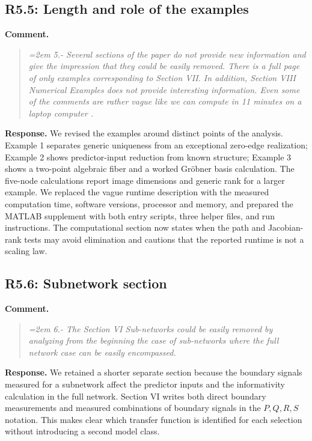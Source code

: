 \documentclass[11pt]{article}
\begin{document}
\subsection*{R5.5: Length and role of the examples}
\textbf{Comment.}
\begin{quote}\itshape\emergencystretch=2em
5.- Several sections of the paper do not provide new information and give the impression that they could be easily removed. There is a full page of only examples corresponding to Section VII. In addition, Section VIII Numerical Examples does not provide interesting information. Even some of the comments are rather vague like we can compute in 11 minutes on a laptop computer .
\end{quote}

\textbf{Response.} We revised the examples around distinct points of the
analysis. Example 1 separates generic uniqueness from an exceptional
zero-edge realization; Example 2 shows predictor-input reduction from
known structure; Example 3 shows a two-point algebraic fiber and a worked
Gr\"obner basis calculation. The five-node calculations report image
dimensions and generic rank for a larger example. We replaced the vague
runtime description with the measured computation time, software
versions, processor and memory, and prepared the MATLAB supplement with
both entry scripts, three helper files, and run instructions. The
computational section now states when the path and Jacobian-rank tests may
avoid elimination and cautions that the reported runtime is not a scaling law.

\subsection*{R5.6: Subnetwork section}
\textbf{Comment.}
\begin{quote}\itshape\emergencystretch=2em
6.- The Section VI Sub-networks could be easily removed by analyzing from the beginning the case of sub-networks where the full network case can be easily encompassed.
\end{quote}

\textbf{Response.} We retained a shorter separate section because the
boundary signals measured for a subnetwork affect the predictor inputs
and the informativity calculation in the full network. Section VI writes
both direct boundary measurements and measured combinations of boundary
signals in the $P,Q,R,S$ notation. This makes clear which transfer
function is identified for each selection without introducing a second
model class.
\end{document}
